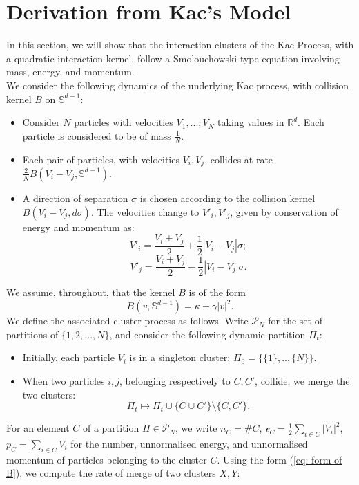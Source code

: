 \section{Derivation from Kac's Model}
In this section, we will show that the interaction clusters of the Kac Process, with a quadratic interaction kernel, follow a Smolouchowski-type equation involving mass, energy, and momentum. \medskip \\ We consider the following dynamics of the underlying Kac process, with collision kernel $B$ on $\mathbb{S}^{d-1}:$
\begin{itemize}
    \item Consider $N$ particles with velocities $V_1, ..., V_N$ taking values in $\mathbb{R}^d.$ Each particle is considered to be of mass $\frac{1}{N}.$
    \item Each pair of particles, with velocities $V_i, V_j$, collides at rate $\frac{2}{N}B(V_i-V_j, \mathbb{S}^{d-1})$. \item A direction of separation $\sigma$ is chosen according to the collision kernel $B(V_i-V_j,d\sigma)$. The velocities change to $V'_i, V'_j$, given by conservation of energy and momentum as: \begin{equation} V'_i=\frac{V_i+V_j}{2}+\frac{1}{2}|V_i-V_j|\sigma;\end{equation}  \begin{equation} V'_j=\frac{V_i+V_j}{2}-\frac{1}{2}|V_i-V_j|\sigma.\end{equation}
\end{itemize} We assume, throughout, that the kernel $B$ is of the form\begin{equation}
    \label{eq: form of B} B(v, \mathbb{S}^{d-1})=\kappa+\gamma|v|^2.
\end{equation}We define the associated cluster process as follows. Write $\mathcal{P}_N$ for the set of partitions of $\{1, 2,...,N\}$, and consider the following dynamic partition $\Pi_t:$ \begin{itemize}
    \item Initially, each particle $V_i$ is in a singleton cluster: $\Pi_0=\{\{1\},..,\{N\}\}$.
    \item When two particles $i,j$, belonging respectively to $C, C'$, collide, we merge the two clusters: \begin{equation}
        \Pi_t \mapsto \Pi_t \cup \{C\cup C'\}\setminus \{C,C'\}.
    \end{equation}
\end{itemize} For an element $C$ of a partition $\Pi\in\mathcal{P}_N$, we write $n_C=\#C$, $\mathcal{e}_C=\frac{1}{2}\sum_{i\in C} |V_i|^2$, $p_C=\sum_{i\in C}V_i$ for the number, unnormalised energy, and unnormalised momentum of particles belonging to the cluster $C$. Using the form (\ref{eq: form of B}), we compute the rate of merge of two clusters $X, Y$: \begin{multline*}

\end{multline*}
